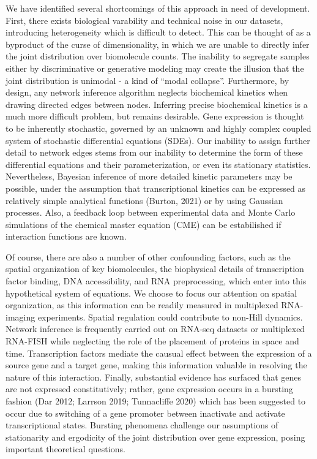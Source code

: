\documentclass{article}
\begin{document}
We have identified several shortcomings of this approach in need of development. First, there exists biological varability and technical noise in our datasets, introducing heterogeneity which is difficult to detect. This can be thought of as a byproduct of the curse of dimensionality, in which we are unable to directly infer the joint distribution over biomolecule counts. The inability to segregate samples either by discriminative or generative modeling may create the illusion that the joint distribution is unimodal - a kind of ``modal collapse''. Furthermore, by design, any network inference algorithm neglects biochemical kinetics when drawing directed edges between nodes. Inferring precise biochemical kinetics is a much more difficult problem, but remains desirable. Gene expression is thought to be inherently stochastic, governed by an unknown and highly complex coupled system of stochastic differential equations (SDEs). Our inability to assign further detail to network edges stems from our inability to determine the form of these differential equations and their parameterization, or even its stationary statistics. Nevertheless, Bayesian inference of more detailed kinetic parameters may be possible, under the assumption that transcriptional kinetics can be expressed as relatively simple analytical functions (Burton, 2021) or by using Gaussian processes. Also, a feedback loop between experimental data and Monte Carlo simulations of the chemical master equation (CME) can be estabilished if interaction functions are known.

Of course, there are also a number of other confounding factors, such as the spatial organization of key biomolecules, the biophysical details of transcription factor binding, DNA accessibility, and RNA preprocessing, which enter into this hypothetical system of equations. We choose to focus our attention on spatial organization, as this information can be readily measured in multiplexed RNA-imaging experiments. Spatial regulation could contribute to non-Hill dynamics.  Network inference is frequently carried out on RNA-seq datasets or multiplexed RNA-FISH while neglecting the role of the placement of proteins in space and time. Transcription factors mediate the causual effect between the expression of a source gene and a target gene, making this information valuable in resolving the nature of this interaction. Finally, substantial evidence has surfaced that genes are not expressed constitutively; rather, gene expression occurs in a bursting fashion (Dar 2012; Larrson 2019; Tunnacliffe 2020) which has been suggested to occur due to switching of a gene promoter between inactivate and activate transcriptional states. Bursting phenomena challenge our assumptions of stationarity and ergodicity of the joint distribution over gene expression, posing important theoretical questions.
\end{document}
